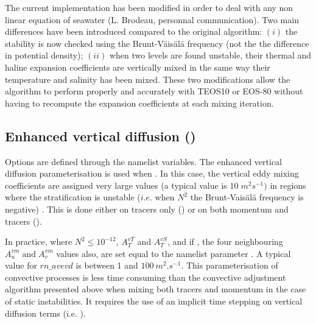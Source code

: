 \documentclass[../main/NEMO_manual]{subfiles}
\begin{document}
The current implementation has been modified in order to deal with any non linear equation of seawater
(L. Brodeau, personnal communication).
Two main differences have been introduced compared to the original algorithm:
$(i)$ the stability is now checked using the Brunt-V\"{a}is\"{a}l\"{a} frequency 
(not the the difference in potential density); 
$(ii)$ when two levels are found unstable, their thermal and haline expansion coefficients are vertically mixed in
the same way their temperature and salinity has been mixed.
These two modifications allow the algorithm to perform properly and accurately with TEOS10 or EOS-80 without
having to recompute the expansion coefficients at each mixing iteration.

\subsection{Enhanced vertical diffusion (\protect{})}
\label{subsec:ZDF_evd}



Options are defined through the   namelist variables.
The enhanced vertical diffusion parameterisation is used when .
In this case, the vertical eddy mixing coefficients are assigned very large values
(a typical value is $10\;m^2s^{-1})$ in regions where the stratification is unstable
($i.e.$ when $N^2$ the Brunt-Vais\"{a}l\"{a} frequency is negative) \citep{Lazar_PhD97, Lazar_al_JPO99}.
This is done either on tracers only () or
on both momentum and tracers ().

In practice, where $N^2\leq 10^{-12}$, $A_T^{vT}$ and $A_T^{vS}$, and if ,
the four neighbouring $A_u^{vm} \;\mbox{and}\;A_v^{vm}$ values also, are set equal to
the namelist parameter .
A typical value for $rn\_avevd$ is between 1 and $100~m^2.s^{-1}$.
This parameterisation of convective processes is less time consuming than
the convective adjustment algorithm presented above when mixing both tracers and
momentum in the case of static instabilities.
It requires the use of an implicit time stepping on vertical diffusion terms
(i.e. ).
\end{document}
